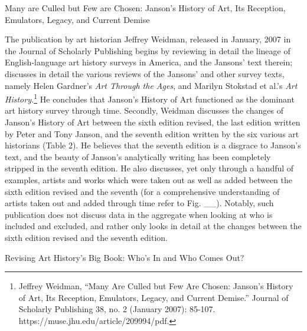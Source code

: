 \documentclass[
  letterpaper,
  DIV=11,
  numbers=noendperiod]{scrreprt}
\begin{document}
Many are Culled but Few are Chosen: Janson's History of Art, Its
Reception, Emulators, Legacy, and Current Demise

The publication by art historian Jeffrey Weidman, released in January,
2007 in the Journal of Scholarly Publishing begins by reviewing in
detail the lineage of English-language art history surveys in America,
and the Jansons' text therein; discusses in detail the various reviews
of the Jansons' and other survey texts, namely Helen Gardner's \emph{Art
Through the Ages}, and Marilyn Stokstad et al.'s \emph{Art
History.}\footnote{Jeffrey Weidman, ``Many Are Culled but Few Are
  Chosen: Janson's History of Art, Its Reception, Emulators, Legacy, and
  Current Demise.'' Journal of Scholarly Publishing 38, no. 2 (January
  2007): 85-107. https://muse.jhu.edu/article/209994/pdf.} He concludes
that Janson's History of Art functioned as the dominant art history
survey through time. Secondly, Weidman discusses the changes of Janson's
History of Art between the sixth edition revised, the last edition
written by Peter and Tony Janson, and the seventh edition written by the
six various art historians (Table 2). He believes that the seventh
edition is a disgrace to Janson's text, and the beauty of Janson's
analytically writing has been completely stripped in the seventh
edition. He also discusses, yet only through a handful of examples,
artists and works which were taken out as well as added between the
sixth edition revised and the seventh (for a comprehensive understanding
of artists taken out and added through time refer to Fig. \_\_).
Notably, such publication does not discuss data in the aggregate when
looking at who is included and excluded, and rather only looks in detail
at the changes between the sixth edition revised and the seventh
edition.

Revising Art History's Big Book: Who's In and Who Comes Out?
\end{document}
